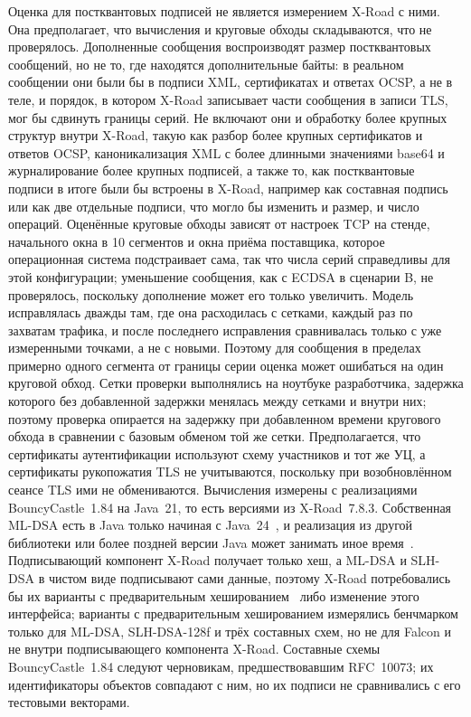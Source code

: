 \documentclass[conference,a4paper]{IEEEtran}
\newcommand{\newtext}[1]{{\color{blue}#1}}
\newcommand{\newgreen}[1]{{\color{green!50!black}#1}}
\newcommand{\newviolet}[1]{{\color{violet}#1}}
\begin{document}
\newtext{Оценка для постквантовых подписей не является измерением X-Road с ними. Она
предполагает, что вычисления и круговые обходы складываются, что не проверялось.} \newtext{Дополненные
сообщения воспроизводят размер постквантовых сообщений, но не то, где находятся дополнительные байты: в
реальном сообщении они были бы в подписи XML, сертификатах и ответах OCSP, а не
в теле, и порядок, в котором X-Road записывает части сообщения в записи TLS, мог бы сдвинуть
границы серий. Не включают они и обработку более крупных структур внутри
X-Road, такую как разбор более крупных сертификатов и ответов OCSP, каноникализация XML с более длинными
значениями base64 и журналирование более крупных подписей, а также то, как постквантовые подписи в итоге были бы
встроены в X-Road, например как составная подпись или как две отдельные подписи, что могло бы изменить
и размер, и число операций.} \newtext{Оценённые} \newtext{круговые обходы} \newtext{зависят от настроек TCP на стенде, начального окна в 10 сегментов и
окна приёма поставщика, которое операционная система подстраивает сама, так что числа серий
справедливы для этой конфигурации; уменьшение сообщения, как с ECDSA в сценарии B, не проверялось, поскольку
дополнение может его только увеличить. \newviolet{Модель исправлялась дважды там, где она расходилась с
сетками, каждый раз по захватам трафика, и после последнего исправления сравнивалась только с
уже измеренными точками, а не с новыми. Поэтому для сообщения в пределах примерно одного сегмента
от границы серии оценка может ошибаться на один круговой обход.} \newgreen{Сетки проверки
выполнялись на ноутбуке разработчика, задержка которого без добавленной задержки менялась между сетками и внутри
них; поэтому проверка опирается на задержку при добавленном времени кругового обхода в сравнении с
базовым обменом той же сетки.} Предполагается, что сертификаты аутентификации используют схему
участников и тот же УЦ, а сертификаты рукопожатия TLS не учитываются, поскольку при возобновлённом
сеансе TLS ими не обмениваются. Вычисления измерены с
реализациями BouncyCastle~1.84 на Java~21, то есть версиями из X-Road~7.8.3. Собственная
ML-DSA есть в Java только начиная с Java~24~\cite{jep497}, и реализация из другой библиотеки или более поздней версии
Java может занимать иное время~\cite{oleksiichuk2026}.
Подписывающий компонент X-Road получает только хеш, а ML-DSA и SLH-DSA в чистом виде подписывают сами
данные, поэтому X-Road потребовались бы их варианты с предварительным хешированием~\cite{fips204,fips205} либо изменение этого
интерфейса; \newviolet{варианты с предварительным хешированием измерялись бенчмарком только для ML-DSA, SLH-DSA-128f и трёх
составных схем, но не для Falcon и не внутри подписывающего компонента X-Road}.
Составные схемы BouncyCastle~1.84 следуют черновикам, предшествовавшим RFC~10073; их идентификаторы объектов
совпадают с ним, но их подписи не сравнивались с его тестовыми векторами.}
\end{document}
